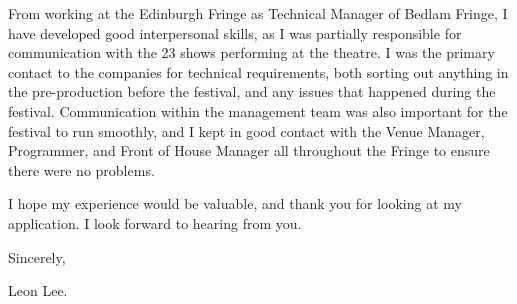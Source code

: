 \documentclass[10pt,english]{article}
\begin{document}
\medskip

From working at the Edinburgh Fringe as Technical Manager of Bedlam Fringe, I have developed good interpersonal skills, as I was partially responsible for communication with the 23 shows performing at the theatre. I was the primary contact to the companies for technical requirements, both sorting out anything in the pre-production before the festival, and any issues that happened during the festival. Communication within the management team was also important for the festival to run smoothly, and I kept in good contact with the Venue Manager, Programmer, and Front of House Manager all throughout the Fringe to ensure there were no problems.

\medskip

I hope my experience would be valuable, and thank you for looking at my application. I look forward to hearing from you.
\medskip

Sincerely,

Leon Lee.
\end{document}

